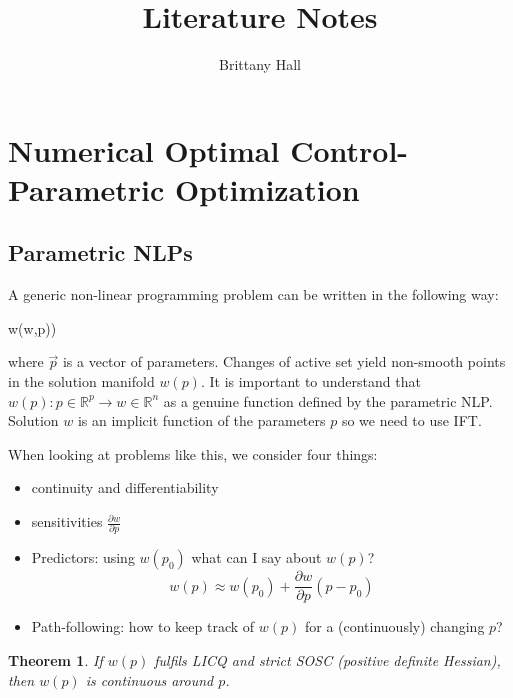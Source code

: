 \documentclass{article}
\title{Literature Notes}
\author{Brittany Hall}
\date{}
\newtheorem{theorem}{Theorem}[section]
\theoremstyle{example}
\theoremstyle{definition}
\theoremstyle{assumption}
\theoremstyle{lemma}
\begin{document}
	\maketitle
	\section{Numerical Optimal Control-Parametric Optimization}
	\subsection{Parametric NLPs}
	A generic non-linear programming problem can be written in the following way:
		\begin{mini!}
			{w}{\Phi(w,p))}{}{}
		\end{mini!}
		where $\vec{p}$ is a vector of parameters.
	Changes of active set yield non-smooth points in the solution manifold $w(p)$.
	It is important to understand that $w(p): p\in\mathbb{R}^p\rightarrow w\in\mathbb{R}^n$ as a genuine function defined by the parametric NLP.
	Solution $w$ is an implicit function of the parameters $p$ so we need to use IFT.
	\par
	When looking at problems like this, we consider four things:
	\begin{itemize}
		\item continuity and differentiability
		\item sensitivities $\frac{\partial w}{\partial p}$
		\item Predictors: using $w(p_0)$ what can I say about $w(p)$?
			\begin{equation*}
				w(p)\approx w(p_0)+\frac{\partial w}{\partial p}(p-p_0)
			\end{equation*}
		\item Path-following: how to keep track of $w(p)$ for a (continuously) changing $p$?
	\end{itemize}
\begin{theorem}
	If $w(p)$ fulfils LICQ and strict SOSC (positive definite Hessian), then $w(p)$ is continuous around $p$.
\end{theorem}
\end{document}

